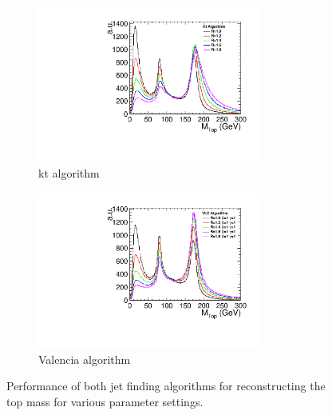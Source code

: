 \begin{figure}
  \centering
  \begin{subfigure}{1\textwidth}
    \centering
    \includegraphics[width=0.8\textwidth]{TopAnalysis/figures/ComparisonKt.pdf}
    \caption[kt algorithm]{kt algorithm}
  \end{subfigure}
  \begin{subfigure}{1\textwidth}
    \centering
    \includegraphics[width=0.8\textwidth]{TopAnalysis/figures/ComparisonVLC.pdf}
    \caption[Valencia algorithm]{Valencia algorithm}
  \end{subfigure}
  \caption[Performance of jet finding algorithms for reconstructing the top mass]{Performance of both jet finding algorithms for reconstructing the top mass for various parameter settings. }
  \label{fig:jetfinding}
\end{figure}


